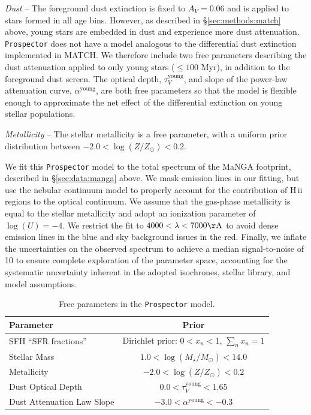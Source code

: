 \documentclass[preprint2]{aastex62}
\newcommand{\hii}{H\,{\sc ii}\xspace}
\begin{document}
\textit{Dust} -- The foreground dust extinction is fixed to $A_V=0.06$ and is applied to stars formed in all age bins. However, as described in \S\ref{sec:methods:match} above, young stars are embedded in dust and experience more dust attenuation. \texttt{Prospector} does not have a model analogous to the differential dust extinction implemented in MATCH. We therefore include two free parameters describing the dust attenuation applied to only young stars ($\leq 100$ Myr), in addition to the foreground dust screen. The optical depth, $\tau_V^\mathrm{young}$, and slope of the power-law attenuation curve, $\alpha^\mathrm{young}$, are both free parameters so that the model is flexible enough to approximate the net effect of the differential extinction on young stellar populations.

\textit{Metallicity} -- The stellar metallicity is a free parameter, with a uniform prior distribution between $-2.0 < \log{(Z/Z_\odot)} < 0.2$. 

We fit this \texttt{Prospector} model to the total spectrum of the MaNGA footprint, described in \S\ref{sec:data:manga} above. We mask emission lines in our fitting, but use the \citet{Byler+2017} nebular continuum model to properly account for the contribution of \hii regions to the optical continuum. We assume that the gas-phase metallicity is equal to the stellar metallicity and adopt an ionization parameter of $\log(U) = -4$. We restrict the fit to $4000 < \lambda < 7000 \mathrm{\AA}$ to avoid dense emission lines in the blue and sky background issues in the red. Finally, we inflate the uncertainties on the observed spectrum to achieve a median signal-to-noise of 10 to ensure complete exploration of the parameter space, accounting for the systematic uncertainty inherent in the adopted isochrones, stellar library, and model assumptions.


\begin{table}
\caption{Free parameters in the \texttt{Prospector} model.} 
\label{tab:prospector_params}
\begin{center}
\begin{tabular}{lc}
\hline \hline
Parameter & Prior \\
\hline
SFH ``SFR fractions'' & Dirichlet prior: $0 < x_n < 1$, $\sum_n x_n = 1$\\
Stellar Mass & $1.0 < \log{(M_\star / M_\odot)} < 14.0$ \\
Metallicity & $-2.0 < \log{(Z/Z_\odot)} < 0.2$ \\
Dust Optical Depth & $0.0 < \tau_V^\mathrm{young} < 1.65$ \\
Dust Attenuation Law Slope & $-3.0 < \alpha^\mathrm{young} < -0.3$\\
\hline
\end{tabular}
\end{center}
\end{table}
\end{document}

